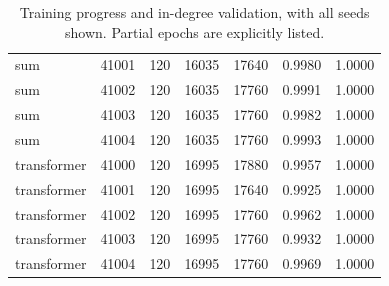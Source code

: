 \begin{table}[t]
{\begin{tabular}{lrrrrrr}
sum & 41001 & 120 & 16035 & 17640 & 0.9980 & 1.0000 \\
sum & 41002 & 120 & 16035 & 17760 & 0.9991 & 1.0000 \\
sum & 41003 & 120 & 16035 & 17760 & 0.9982 & 1.0000 \\
sum & 41004 & 120 & 16035 & 17760 & 0.9993 & 1.0000 \\
transformer & 41000 & 120 & 16995 & 17880 & 0.9957 & 1.0000 \\
transformer & 41001 & 120 & 16995 & 17640 & 0.9925 & 1.0000 \\
transformer & 41002 & 120 & 16995 & 17760 & 0.9962 & 1.0000 \\
transformer & 41003 & 120 & 16995 & 17760 & 0.9932 & 1.0000 \\
transformer & 41004 & 120 & 16995 & 17760 & 0.9969 & 1.0000 \\
\bottomrule
\end{tabular}
}%
\caption{Training progress and in-degree validation, with all seeds shown. Partial epochs are explicitly listed.}\label{tab:training}
\end{table}
